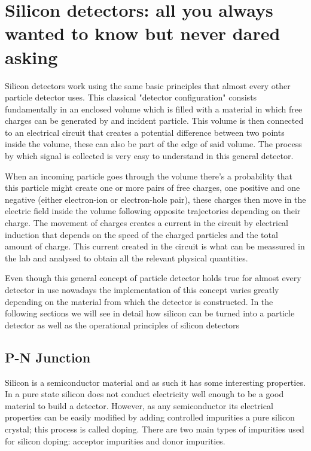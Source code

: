\chapter{Silicon detectors: all you always wanted to know but never dared asking} %
\label{cha:simulator_development}

Silicon detectors work using the same basic principles that almost every other particle detector uses. This classical "detector configuration" consists fundamentally in an enclosed volume which is filled with a material in which free charges can be generated by and incident particle. This volume is then connected to an electrical circuit that creates a  potential difference between two points inside the volume, these can also be part of the edge of said volume. The process by which signal is collected is very easy to understand in this general detector.

When an incoming particle goes through the volume there's a probability that this particle might create one or more pairs of free charges, one positive and one negative (either electron-ion or electron-hole pair), these charges then move in the electric field inside the volume following opposite trajectories depending on their charge. The movement of charges creates a current in the circuit by electrical induction that depends on the speed of the charged particles and the total amount of charge. This current created in the circuit is what can be meassured in the lab and analysed to obtain all the relevant physical quantities.

Even though this general concept of particle detector holds true for almost every detector in use nowadays the implementation of this concept varies greatly depending on the material from which the detector is constructed. In the following sections we will see in detail how silicon can be turned into a particle detector as well as the operational principles of silicon detectors

\section{P-N Junction}

Silicon is a semiconductor material and as such it has some interesting properties. In a pure state silicon does not conduct electricity well enough to be a good material to build a detector. However, as any semiconductor its electrical properties can be easily modified by adding controlled impurities a pure silicon crystal; this process is called doping. There are two main types of impurities used for silicon doping: acceptor impurities and donor impurities.


